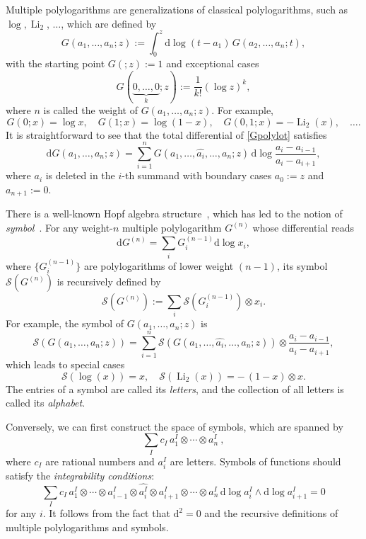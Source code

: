 \documentclass[a4paper,12pt]{article}
\newcommand{\dif}{\mathrm{d}} %
\begin{document}
Multiple polylogarithms are generalizations of classical polylogarithms, such as $\log,\operatorname{Li}_2$, $\dots$, which are defined by~\cite{goncharov2005galois}
\begin{equation}
    G(a_{1},\ldots,a_{n};z):=\int_{0}^{z}\dif \log(t-a_{1})\, G(a_{2},\ldots,a_{n};t), \label{Gpolylot} 
\end{equation} 
with the starting point $G(;z):=1$ and exceptional cases
\[
    G(\underbrace{0, \ldots, 0}_{k} ; z):=\frac{1}{k !}(\log z)^{k},
\]
where $n$ is called the weight of $G(a_{1},\ldots,a_{n};z)$. For example,
\[
    G(0;x)=\log x,\quad G(1;x)=\log(1-x),\quad G(0,1;x)=-\operatorname{Li}_2(x),\quad \dots.
\]
It is straightforward to see that the total differential of \eqref{Gpolylot} satisfies
\begin{equation}
    \dif G(a_1,\dots,a_n;z) = \sum_{i=1}^n G(a_1,\dots,\hat{a_i},\dots,a_n;z)\,\dif \log \frac{a_i-a_{i{-}1}}{a_i-a_{i{+}1}},
\end{equation}
where $a_i$ is deleted in the $i$-th summand with boundary cases $a_0:=z$ and $a_{n{+}1}:=0$. 

There is a well-known Hopf algebra structure~\cite{Goncharov:2005sla}, which has led to the notion of \textit{symbol}~\cite{Goncharov:2010jf, Duhr:2011zq}. For any weight-$n$ multiple polylogarithm $G^{(n)}$ whose differential reads
\[
\dif G^{(n)}=\sum_i G^{(n-1)}_i \dif\log x_i,
\]
where $\{G^{(n-1)}_i\}$ are polylogarithms of lower weight $(n{-}1)$, its symbol $\mathcal{S}(G^{(n)})$ is recursively defined by
\[
\mathcal{S}(G^{(n)}):=\sum_i \mathcal{S}(G^{(n-1)}_i)\otimes x_i.
\]
For example, the symbol of $G(a_1,\dots,a_n;z)$ is 
\[
    \mathcal{S}(G(a_1,\dots,a_n;z)) = \sum_{i=1}^n \mathcal{S}(G(a_1,\dots,\hat{a_i},\dots,a_n;z))\otimes \frac{a_i-a_{i{-}1}}{a_i-a_{i{+}1}},
\]
which leads to special cases
\[
\mathcal{S}(\log(x))=x,\quad 
\mathcal{S}(\operatorname{Li}_2(x))=-\,(1-x)\otimes x.
\]
The entries of a symbol are called its \textit{letters}, and the collection of all letters is called its \textit{alphabet}.

Conversely, we can first construct the space of symbols, which are spanned by
\[
    \sum_I c_I\,a^I_1\otimes \cdots \otimes a^I_n \:,
\]
where $c_I$ are rational numbers and $a^I_i$ are letters. Symbols of functions should satisfy the \textit{integrability conditions}:
\begin{equation}\label{intcondition}
    \sum_I c_I\,a^I_1\otimes \cdots \otimes a^I_{i-1}\otimes \widehat{a^I_{i}}\otimes \widehat{a^I_{i+1}}\otimes \cdots \otimes a^I_n \, \dif \log a^I_{i}\wedge \dif \log a^I_{i+1}=0
\end{equation}
for any $i$. It follows from the fact that $\dif^2=0$ and the recursive definitions of multiple polylogarithms and symbols.
\end{document}
